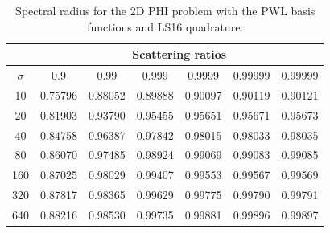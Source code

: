 \begin{table}
\caption{Spectral radius for the 2D PHI problem with the PWL basis functions and LS16 quadrature.}
\begin{center}
\def\arraystretch{1.6}
\begin{tabular}{|c|c|c|c|c|c|c|}
\hline
& \multicolumn{6}{c}{Scattering ratios}\vline\\
\hline
$\sigma$ & 0.9 & 0.99& 0.999& 0.9999& 0.99999& 0.99999 \\
\hline
10  &0.75796&0.88052&0.89888&0.90097&0.90119&0.90121\\
20  &0.81903&0.93790&0.95455&0.95651&0.95671&0.95673\\
40  &0.84758&0.96387&0.97842&0.98015&0.98033&0.98035\\
80  &0.86070&0.97485&0.98924&0.99069&0.99083&0.99085\\
160&0.87025&0.98029&0.99407&0.99553&0.99567&0.99569\\
320&0.87817&0.98365&0.99629&0.99775&0.99790&0.99791\\
640&0.88216&0.98530&0.99735&0.99881&0.99896&0.99897\\
\hline
\end{tabular}
\end{center}
\label{tab::DSA_2DPHI_LS16}
\end{table}


